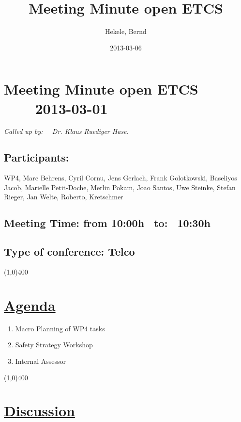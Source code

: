 \documentclass[a4paper]{article}
\title{Meeting Minute open ETCS}
\author{Hekele, Bernd}
\date{2013-03-06}
\begin{document}
\section*{\large{Meeting Minute open ETCS \ \ \ \ 2013-03-01}}

\large{\emph{Called up by: \ \  Dr. Klaus Ruediger Hase.}}

\subsection*{Participants:} WP4, Marc Behrens, Cyril Cornu, Jens Gerlach, Frank Golotkowski, Baseliyos Jacob, Marielle Petit-Doche, Merlin Pokam, Joao Santos, Uwe Steinke, Stefan Rieger, Jan Welte, Roberto, Kretschmer\\

\subsection*{Meeting Time: from 10:00h \ to: \ 10:30h}

\subsection*{Type of conference: Telco}

\line(1,0){400}
\section*{\underline{Agenda}}
\begin{enumerate}
\item Macro Planning of WP4 tasks
\item Safety Strategy Workshop
\item Internal Assessor
\end{enumerate}
\line(1,0){400}
\section*{\underline{Discussion}}
\end{document}

